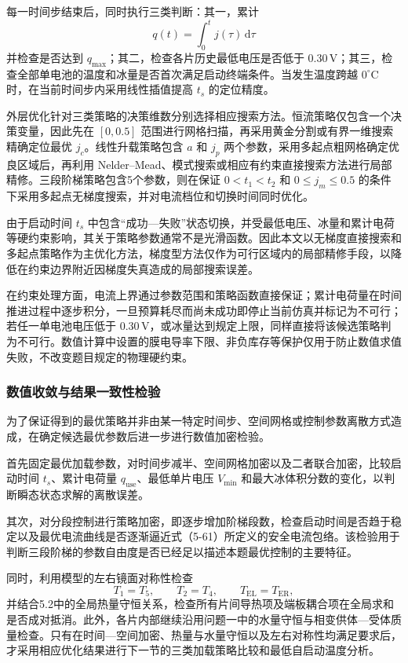 \documentclass[bwprint]{gmcmthesis}
\numberwithin{figure}{section}
\begin{document}
\noindent 每一时间步结束后，同时执行三类判断：其一，累计
\[
q(t) = \int_0^t j(\tau) \, \mathrm{d}\tau
\]
并检查是否达到 \(q_{\text{max}}\)；其二，检查各片历史最低电压是否低于 \(0.30 \, \text{V}\)；其三，检查全部单电池的温度和冰量是否首次满足启动终端条件。当发生温度跨越 \(0^\circ\text{C}\) 时，在当前时间步内采用线性插值提高 \(t_s\) 的定位精度。

\noindent 外层优化针对三类策略的决策维数分别选择相应搜索方法。恒流策略仅包含一个决策变量，因此先在 \([0, 0.5]\) 范围进行网格扫描，再采用黄金分割或有界一维搜索精确定位最优 \(j_c\)。线性升载策略包含 \(a\) 和 \(j_p\) 两个参数，采用多起点粗网格确定优良区域后，再利用 Nelder--Mead、模式搜索或相应有约束直接搜索方法进行局部精修。三段阶梯策略包含5个参数，则在保证 \(0 < t_1 < t_2\) 和 \(0 \leq j_m \leq 0.5\) 的条件下采用多起点无梯度搜索，并对电流档位和切换时间同时优化。

\noindent 由于启动时间 \(t_s\) 中包含“成功—失败”状态切换，并受最低电压、冰量和累计电荷等硬约束影响，其关于策略参数通常不是光滑函数。因此本文以无梯度直接搜索和多起点策略作为主优化方法，梯度型方法仅作为可行区域内的局部精修手段，以降低在约束边界附近因梯度失真造成的局部搜索误差。

\noindent 在约束处理方面，电流上界通过参数范围和策略函数直接保证；累计电荷量在时间推进过程中逐步积分，一旦预算耗尽而尚未成功即停止当前仿真并标记为不可行；若任一单电池电压低于 \(0.30 \, \text{V}\)，或冰量达到规定上限，同样直接将该候选策略判为不可行。数值计算中设置的膜电导率下限、非负库存等保护仅用于防止数值求值失败，不改变题目规定的物理硬约束。

\subsubsection{数值收敛与结果一致性检验}

\noindent 为了保证得到的最优策略并非由某一特定时间步、空间网格或控制参数离散方式造成，在确定候选最优参数后进一步进行数值加密检验。

\noindent 首先固定最优加载参数，对时间步减半、空间网格加密以及二者联合加密，比较启动时间 \(t_s\)、累计电荷量 \(q_{\text{use}}\)、最低单片电压 \(V_{\text{min}}\) 和最大冰体积分数的变化，以判断瞬态状态求解的离散误差。

\noindent 其次，对分段控制进行策略加密，即逐步增加阶梯段数，检查启动时间是否趋于稳定以及最优电流曲线是否逐渐逼近式（5-61）所定义的安全电流包络。该检验用于判断三段阶梯的参数自由度是否已经足以描述本题最优控制的主要特征。

\noindent 同时，利用模型的左右镜面对称性检查
\[
T_1 = T_5, \qquad T_2 = T_4, \qquad T_{\text{EL}} = T_{\text{ER}},
\]
并结合5.2中的全局热量守恒关系，检查所有片间导热项及端板耦合项在全局求和是否成对抵消。此外，各片内部继续沿用问题一中的水量守恒与相变供体—受体质量检查。只有在时间—空间加密、热量与水量守恒以及左右对称性均满足要求后，才采用相应优化结果进行下一节的三类加载策略比较和最低自启动温度分析。
\end{document}
